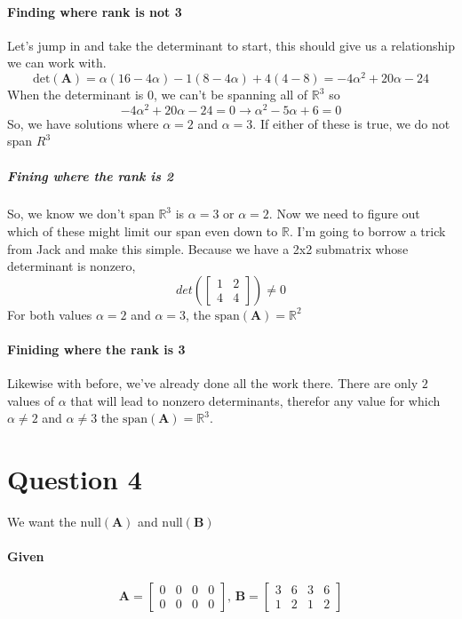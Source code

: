 \documentclass{article}
\begin{document}
        \paragraph{Finding where rank is not 3}
            Let's jump in and take the determinant to start, this should give us a relationship we can work with.
            \[
                \text{det}(\mathbf{A})=\alpha(16-4\alpha)-1(8-4\alpha)+4(4-8)=-4\alpha^2+20\alpha-24
            \]
            When the determinant is $0$, we can't be spanning all of $\mathbb{R}^3$ so
            \[
                -4\alpha^2+20\alpha-24=0
                \rightarrow
                \alpha^2-5\alpha+6=0
            \]
            So, we have solutions where $\alpha=2$ and $\alpha=3$. If either of these is true, we do not span $R^3$
            \subparagraph{Fining where the rank is 2}
                So, we know we don't span $\mathbb{R}^3$ is $\alpha=3$ or $\alpha=2$. Now we need to figure out which
                of these might limit our span even down to $\mathbb{R}$. I'm going to borrow a trick from Jack and make this simple.
                Because we have a 2x2 submatrix whose determinant is nonzero, $$det(\begin{bmatrix}1&2\\4&4\end{bmatrix})\ne0$$
                For both values $\alpha=2$ and $\alpha=3$, the $\text{span}(\mathbf{A})=\mathbb{R}^2$
        \paragraph{Finiding where the rank is 3}
            Likewise with before, we've already done all the work there. There are only $2$ values of $\alpha$
            that will lead to nonzero determinants, therefor any value for which $\alpha \ne 2$ and $\alpha \ne 3$
            the $\text{span}(\mathbf{A})=\mathbb{R}^3$.
    \section{Question 4}
        We want the $\text{null}(\mathbf{A})$ and $\text{null}(\mathbf{B})$ 
            \paragraph{Given}
                \[
                    \mathbf{A}=\begin{bmatrix}0&0&0&0\\0&0&0&0\end{bmatrix}
                    \text{, }
                    \mathbf{B}=\begin{bmatrix}3&6&3&6\\1&2&1&2\end{bmatrix}
                \]
\end{document}
